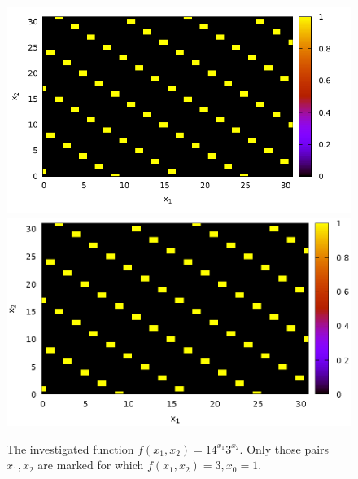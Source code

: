 \begin{figure}
\centering
\ifpdf
\includegraphics[angle=0]
{./part4/quantcomp/picdiscretlog1.pdf}
\else
\includegraphics[angle=0]
{./part4/quantcomp/picdiscretlog1.eps}
\fi

%

\caption{The investigated function $f(x_1, x_2) = 14^{x_1}3^{x_2}$. Only those pairs $x_1, x_2$ are marked for which $f(x_1, x_2) = 3, x_0 = 1$.} 
\label{fig:part4:quantcomp:dl1}
\end{figure}
